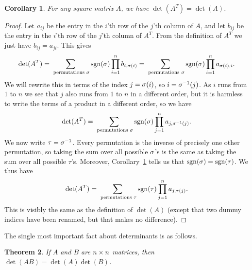 \documentclass[reqno]{amsart}
\newtheorem{theorem}{Theorem}[section]
\newtheorem{corollary}[theorem]{Corollary}
\theoremstyle{definition}
\begin{document}
\begin{corollary}\label{cor-sgn-transpose}
 For any square matrix $A$, we have $\det(A^T)=\det(A)$.
\end{corollary}
\begin{proof}
 Let $a_{ij}$ be the entry in the $i$'th row of the $j$'th column of
 $A$, and let $b_{ij}$ be the entry in the $i$'th row of the $j$'th
 column of $A^T$.  From the definition of $A^T$ we just have
 $b_{ij}=a_{ji}$.  This gives
 \[ \det(A^T) =
     \sum_{\text{ permutations } \sigma}
      \operatorname{sgn}(\sigma) \prod_{i=1}^n b_{i,\sigma(i)}
      =
     \sum_{\text{ permutations } \sigma}
      \operatorname{sgn}(\sigma) \prod_{i=1}^n a_{\sigma(i),i}.
 \]
 We will rewrite this in terms of the index $j=\sigma(i)$, so
 $i=\sigma^{-1}(j)$.  As $i$ runs from $1$ to $n$ we see that $j$ also
 runs from $1$ to $n$ in a different order, but it is harmless to
 write the terms of a product in a different order, so we have
 \[ \det(A^T) =
     \sum_{\text{ permutations } \sigma} \operatorname{sgn}(\sigma) \prod_{j=1}^n
     a_{j,\sigma^{-1}(j)}.
 \]
 We now write $\tau=\sigma^{-1}$.  Every permutation is the inverse of
 precisely one other permutation, so taking the sum over all possible
 $\sigma$'s is the same as taking the sum over all possible $\tau$'s.
 Moreover, Corollary~\ref{cor-sgn-transpose} tells us that
 $\operatorname{sgn}(\sigma)=\operatorname{sgn}(\tau)$.  We thus have
 \[ \det(A^T) =
     \sum_{\text{ permutations } \tau}
      \operatorname{sgn}(\tau) \prod_{j=1}^n a_{j,\tau(j)}.
 \]
 This is visibly the same as the definition of $\det(A)$ (except that
 two dummy indices have been renamed, but that makes no difference).
\end{proof}

The single most important fact about determinants is as follows.

\begin{theorem}\label{thm-det-prod}
 If $A$ and $B$ are $n\times n$ matrices, then $\det(AB)=\det(A)\det(B)$.
\end{theorem}
\end{document}
